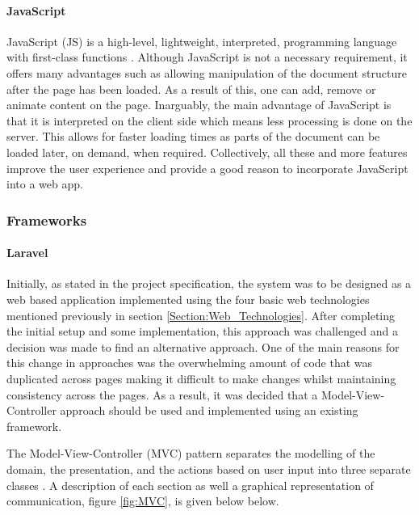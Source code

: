 \paragraph{JavaScript} JavaScript (JS) is a high-level, lightweight, interpreted, programming language with first-class functions \cite{Mozilla:JavaScript}. Although JavaScript is not a necessary requirement, it offers many advantages such as allowing manipulation of the document structure after the page has been loaded. As a result of this, one can add, remove or animate content on the page. Inarguably, the main advantage of JavaScript is that it is interpreted on the client side which means less processing is done on the server. This allows for faster loading times as parts of the document can be loaded later, on demand, when required. Collectively, all these and more features improve the user experience and provide a good reason to incorporate JavaScript into a web app.

\subsubsection{Frameworks}

\paragraph{Laravel}
Initially, as stated in the project specification, the system was to be designed as a web based application implemented using the four basic web technologies mentioned previously in section \ref{Section:Web_Technologies}. After completing the initial setup and some implementation, this approach was challenged and a decision was made to find an alternative approach. One of the main reasons for this change in approaches was the overwhelming amount of code that was duplicated across pages making it difficult to make changes whilst maintaining consistency across the pages. As a result, it was decided that a Model-View-Controller approach should be used and implemented using an existing framework.

The Model-View-Controller (MVC) pattern separates the modelling of the domain, the presentation, and the actions based on user input into three separate classes \cite{MSDN:MVC}. A description of each section as well a graphical representation of communication, figure \ref{fig:MVC}, is given below below.

